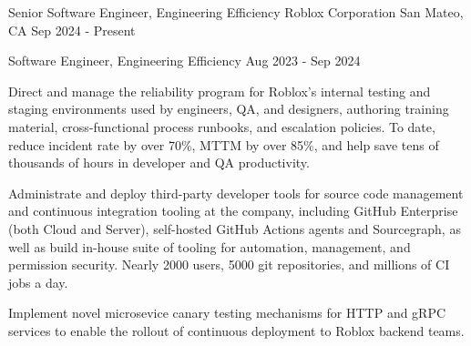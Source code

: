 \documentclass[]{awesome-cv}
\begin{document}
    
\begin{center}

	\makecvheader

\end{center}

\vspace{-2mm}

	

	\cventry
	{Senior Software Engineer, Engineering Efficiency}
	{Roblox Corporation}
	{San Mateo, CA}
	{Sep 2024 - Present}
	{}

	\vspace{-7mm}
	\cventry
	{Software Engineer, Engineering Efficiency}
	{}
	{}
	{Aug 2023 - Sep 2024}
	{\begin{cvitems}
		\item{Direct and manage the reliability program for Roblox's internal testing and staging environments used by engineers, QA, and designers, authoring training material, cross-functional process runbooks, and escalation policies. To date, reduce incident rate by over 70\%, MTTM by over 85\%, and help save tens of thousands of hours in developer and QA productivity.}
		\item{Administrate and deploy third-party developer tools for source code management and continuous integration tooling at the company, including GitHub Enterprise (both Cloud and Server), self-hosted GitHub Actions agents and Sourcegraph, as well as build in-house suite of tooling for automation, management, and permission security. Nearly 2000 users, 5000 git repositories, and millions of CI jobs a day.}
		\item{Implement novel microsevice canary testing mechanisms for HTTP and gRPC services to enable the rollout of continuous deployment to Roblox backend teams.}
	\end{cvitems}}
\end{document}

